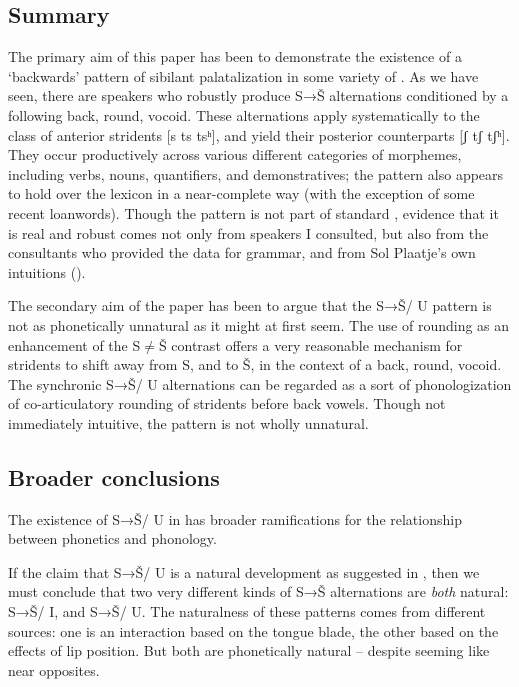 \subsection{Summary}\label{sec:bennett:5.1}

The primary aim of this paper has been to demonstrate the existence of a ‘backwards’ pattern of sibilant palatalization in some variety of . As we have seen, there are speakers who robustly produce S→Š alternations conditioned by a following back, round, vocoid. These alternations apply systematically to the class of anterior stridents [s ts tsʰ], and yield their posterior counterparts [ʃ tʃ tʃʰ]. They occur productively across various different categories of morphemes, including verbs, nouns, quantifiers, and demonstratives; the pattern also appears to hold over the lexicon in a near-complete way (with the exception of some recent loanwords). Though the pattern is not part of standard , evidence that it is real and robust comes not only from speakers I consulted, but also from the consultants who provided the data for  grammar, and from Sol Plaatje’s own intuitions (\citealt{Jones&Plaatje1916}).

The secondary aim of the paper has been to argue that the S→Š/ {\longrule} U pattern is not as phonetically unnatural as it might at first seem. The use of rounding as an enhancement of the S${\neq}$Š contrast offers a very reasonable mechanism for stridents to shift away from S, and to Š, in the context of a back, round, vocoid. The synchronic S→Š/ {\longrule} U alternations can be regarded as a sort of phonologization of co-articulatory rounding of stridents before back vowels. Though not immediately intuitive, the pattern is not wholly unnatural.

\subsection{Broader conclusions}\label{sec:bennett:5.2}

The existence of S→Š/ {\longrule} U in  has broader ramifications for the relationship between phonetics and phonology. 

If the claim that S→Š/ {\longrule} U is a natural development as suggested in , then we must conclude that two very different kinds of S→Š alternations are \textit{both} natural: S→Š/ {\longrule} I, and S→Š/ {\longrule} U. The naturalness of these patterns comes from different sources: one is an interaction based on the tongue blade, the other based on the effects of lip position. But both are phonetically natural – despite seeming like near opposites. 

